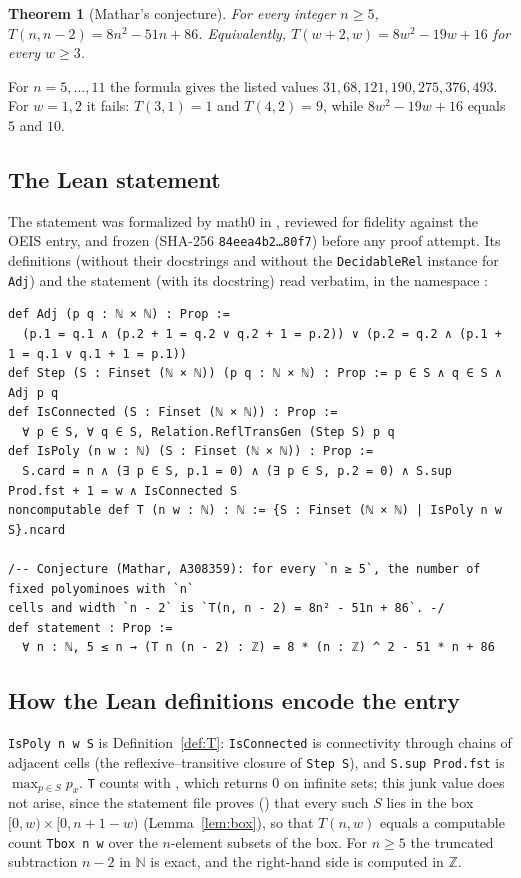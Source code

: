 \documentclass[11pt]{amsart}
\theoremstyle{plain}
\newtheorem{theorem}{Theorem}
\theoremstyle{definition}
\newcommand{\code}[1]{\texttt{#1}}
\newcommand{\N}{\mathbb{N}}
\newcommand{\Z}{\mathbb{Z}}
\begin{document}
\begin{theorem}[Mathar's conjecture]\label{thm:main}
For every integer $n\ge5$, $T(n,n-2)=8n^2-51n+86$. Equivalently, $T(w+2,w)=8w^2-19w+16$ for every $w\ge3$.
\end{theorem}

For $n=5,\dots,11$ the formula gives the listed values $31,68,121,190,275,376,493$. For $w=1,2$ it fails: $T(3,1)=1$ and $T(4,2)=9$, while $8w^2-19w+16$ equals $5$ and $10$.

\subsection*{The Lean statement}
The statement was formalized by math0 in , reviewed for fidelity against the OEIS entry, and frozen (SHA-256 \texttt{84eea4b2\ldots80f7}) before any proof attempt. Its definitions (without their docstrings and without the \code{DecidableRel} instance for \code{Adj}) and the statement (with its docstring) read verbatim, in the namespace :
\begin{lstlisting}[basicstyle=\ttfamily\scriptsize]
def Adj (p q : ℕ × ℕ) : Prop :=
  (p.1 = q.1 ∧ (p.2 + 1 = q.2 ∨ q.2 + 1 = p.2)) ∨ (p.2 = q.2 ∧ (p.1 + 1 = q.1 ∨ q.1 + 1 = p.1))
def Step (S : Finset (ℕ × ℕ)) (p q : ℕ × ℕ) : Prop := p ∈ S ∧ q ∈ S ∧ Adj p q
def IsConnected (S : Finset (ℕ × ℕ)) : Prop :=
  ∀ p ∈ S, ∀ q ∈ S, Relation.ReflTransGen (Step S) p q
def IsPoly (n w : ℕ) (S : Finset (ℕ × ℕ)) : Prop :=
  S.card = n ∧ (∃ p ∈ S, p.1 = 0) ∧ (∃ p ∈ S, p.2 = 0) ∧ S.sup Prod.fst + 1 = w ∧ IsConnected S
noncomputable def T (n w : ℕ) : ℕ := {S : Finset (ℕ × ℕ) | IsPoly n w S}.ncard

/-- Conjecture (Mathar, A308359): for every `n ≥ 5`, the number of fixed polyominoes with `n`
cells and width `n - 2` is `T(n, n - 2) = 8n² - 51n + 86`. -/
def statement : Prop :=
  ∀ n : ℕ, 5 ≤ n → (T n (n - 2) : ℤ) = 8 * (n : ℤ) ^ 2 - 51 * n + 86
\end{lstlisting}

\subsection*{How the Lean definitions encode the entry}
\code{IsPoly n w S} is Definition~\ref{def:T}: \code{IsConnected} is connectivity through chains of adjacent cells (the reflexive--transitive closure of \code{Step S}), and \code{S.sup Prod.fst} is $\max_{p\in S}p_x$. \code{T} counts with , which returns $0$ on infinite sets; this junk value does not arise, since the statement file proves () that every such $S$ lies in the box $[0,w)\times[0,n+1-w)$ (Lemma~\ref{lem:box}), so that $T(n,w)$ equals a computable count \code{Tbox n w} over the $n$-element subsets of the box. For $n\ge5$ the truncated subtraction $n-2$ in $\N$ is exact, and the right-hand side is computed in $\Z$.
\end{document}
